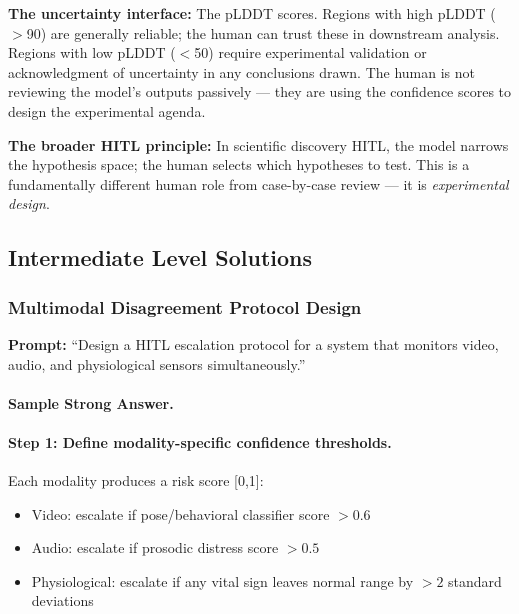 \textbf{The uncertainty interface:} The pLDDT scores. Regions with high pLDDT ($>$90) are generally reliable; the human can trust these in downstream analysis. Regions with low pLDDT ($<$50) require experimental validation or acknowledgment of uncertainty in any conclusions drawn. The human is not reviewing the model's outputs passively --- they are using the confidence scores to design the experimental agenda.

\textbf{The broader HITL principle:} In scientific discovery HITL, the model narrows the hypothesis space; the human selects which hypotheses to test. This is a fundamentally different human role from case-by-case review --- it is \emph{experimental design}.

\subsection{Intermediate Level Solutions}

\subsubsection{Multimodal Disagreement Protocol Design}

\textbf{Prompt:} ``Design a HITL escalation protocol for a system that monitors video, audio, and physiological sensors simultaneously.''

\paragraph{Sample Strong Answer.}

\paragraph{Step 1: Define modality-specific confidence thresholds.}

Each modality produces a risk score [0,1]:
\begin{itemize}
    \item Video: escalate if pose/behavioral classifier score $> 0.6$
    \item Audio: escalate if prosodic distress score $> 0.5$
    \item Physiological: escalate if any vital sign leaves normal range by $> 2$ standard deviations
\end{itemize}

